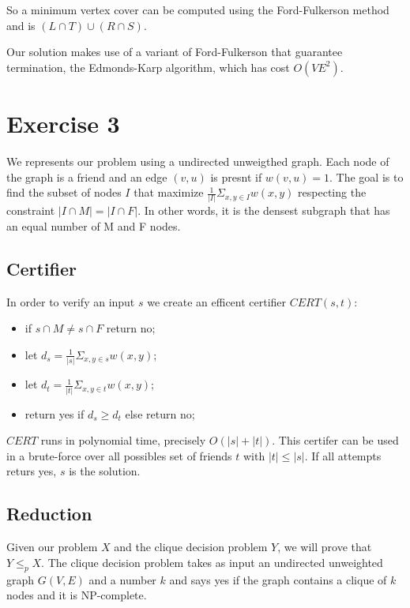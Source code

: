 \documentclass[paper=a4, fontsize=11pt]{scrartcl} %
\numberwithin{equation}{section} %
\numberwithin{figure}{section} %
\numberwithin{table}{section} %
\begin{document}
So a minimum vertex cover can be computed using the Ford-Fulkerson method and is $(L \cap T) \cup (R \cap S)$.

Our solution makes use of a variant of Ford-Fulkerson that guarantee termination, the Edmonds-Karp algorithm, which has cost $O(V E^2)$.



\newpage
\section*{Exercise 3}

We represents our problem using a undirected unweigthed graph. Each node of the graph is a friend and an edge $(v,u)$ is presnt if $w(v,u) = 1$.
The goal is to find the subset of nodes $I$ that maximize $\frac{1}{|I|} \Sigma_{x,y \in I} w(x, y)$ respecting the constraint $|I \cap M| = |I \cap F|$.
In other words, it is the densest subgraph that has an equal number of M and F nodes.

\subsection*{Certifier}

In order to verify an input $s$ we create an efficent certifier $CERT(s, t)$:

\begin{itemize}
    \item if $s \cap M \neq s \cap F$ return no;
    \item let $d_s = \frac{1}{|s|} \Sigma_{x,y \in s} w(x, y)$;
    \item let $d_t = \frac{1}{|t|} \Sigma_{x,y \in t} w(x, y)$;
    \item return yes if $d_s \geq d_t$ else return no;
\end{itemize}

$CERT$ runs in polynomial time, precisely $O(|s|+|t|)$. This certifer can be used in a brute-force over all possibles set of friends $t$ with $|t| \leq |s|$. If all attempts returs yes, $s$ is the solution.

\subsection*{Reduction}

Given our problem $X$ and the clique decision problem $Y$, we will prove that $Y \leq_p X$.
The clique decision problem takes as input an undirected unweighted graph $G(V, E)$ and a number $k$ and says yes if the graph contains a clique of $k$ nodes and it is NP-complete.
\end{document}
